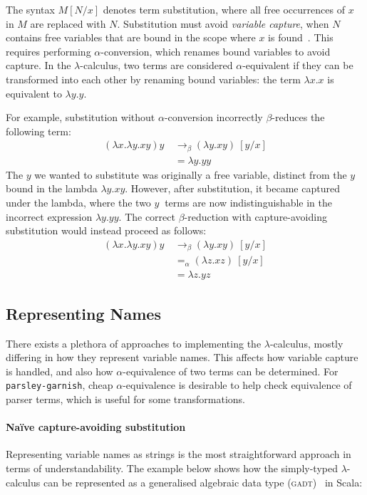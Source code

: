 \documentclass[../../../main.tex]{subfiles}
\begin{document}
The syntax $M[N/x]$ denotes term substitution, where all free occurrences of $x$ in $M$ are replaced with $N$.
Substitution must avoid \emph{variable capture}, when $N$ contains free variables that are bound in the scope where $x$ is found~\cite{van-bakel_tsfpl_2022}.
This requires performing $\alpha$-conversion, which renames bound variables to avoid capture.
In the $\lambda$-calculus, two terms are considered $\alpha$-equivalent if they can be transformed into each other by renaming bound variables: the term $\lambda x. x$ is equivalent to $\lambda y. y$.

For example, substitution without $\alpha$-conversion incorrectly $\beta$-reduces the following term:
\begin{align*}
(\lambda x. \lambda y. x y) y\ &\rightarrow_\beta (\lambda y. x y)\ [y / x] \\
&= \lambda y. y y
\end{align*}
The $y$ we wanted to substitute was originally a free variable, distinct from the $y$ bound in the lambda $\lambda y. x y$.
However, after substitution, it became captured under the lambda, where the two $y\ $ terms are now indistinguishable in the incorrect expression $\lambda y. y y$.
The correct $\beta$-reduction with capture-avoiding substitution would instead proceed as follows:
\begin{align*}
(\lambda x. \lambda y. x y) y\ &\rightarrow_\beta (\lambda y. x y)\ [y / x] \\
&=_\alpha (\lambda z. x z)\ [y / x] \\
&= \lambda z. y z
\end{align*}

\subsection{Representing Names}
There exists a plethora of approaches to implementing the $\lambda$-calculus, mostly differing in how they represent variable names.
This affects how variable capture is handled, and also how $\alpha$-equivalence of two terms can be determined.
For \texttt{parsley-garnish}, cheap $\alpha$-equivalence is desirable to help check equivalence of parser terms, which is useful for some transformations.

\paragraph{Naïve capture-avoiding substitution}
Representing variable names as strings is the most straightforward approach in terms of understandability.
The example below shows how the simply-typed $\lambda$-calculus can be represented as a generalised algebraic data type (\textsc{gadt})~\cite{cheney_gadt_2003} in Scala:
\end{document}
